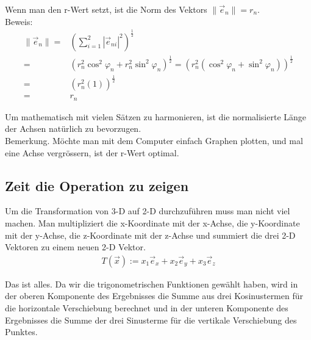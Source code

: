 \documentclass[a4paper]{article}
\begin{document}
Wenn man den r-Wert setzt, ist die Norm des Vektors $\|\vec{e}_n\| = r_n$.\\

Beweis:\\
\begin{displaymath}
\begin{align}
    \|\vec{e}_n\| =& (\sum_{i=1}^{2}|\vec{e}_{ni}|^2)^{\frac12} \\
    =& (r_{n}^{2}\cos^{2}\varphi_n + r_{n}^{2}\sin^{2}\varphi_n)^{\frac12} = (r_{n}^2(\cos^{2}\varphi_n + \sin^{2}\varphi_n))^{\frac12}\\
    =& (r_{n}^2(1))^{\frac12} \\
    =& r_n
\end{align}
\end{displaymath}

Um mathematisch mit vielen S\"atzen zu harmonieren, ist die normalisierte L\"ange der Achsen nat\"urlich zu bevorzugen.\\

Bemerkung. M\"ochte man mit dem Computer einfach Graphen plotten, und mal eine Achse vergr\"ossern, ist der r-Wert optimal.\\


\subsection{Zeit die Operation zu zeigen}


Um die Transformation von 3-D auf 2-D durchzuf\"uhren muss man nicht viel machen. Man multipliziert die x-Koordinate mit der x-Achse,
die y-Koordinate mit der y-Achse, die z-Koordinate mit der z-Achse und summiert die drei 2-D Vektoren zu einem neuen 2-D Vektor.\\

\begin{displaymath}
\begin{align}
    T(\vec{x}) := x_1 \vec{e}_x + x_2 \vec{e}_y + x_3 \vec{e}_z
\end{align}
\end{displaymath}

Das ist alles. Da wir die trigonometrischen Funktionen gew\"ahlt haben, wird in der oberen Komponente des Ergebnisses die Summe aus drei Kosinustermen f\"ur die horizontale Verschiebung berechnet und in der unteren Komponente des Ergebnisses die Summe der drei Sinusterme f\"ur die vertikale Verschiebung des Punktes. 
\end{document}
